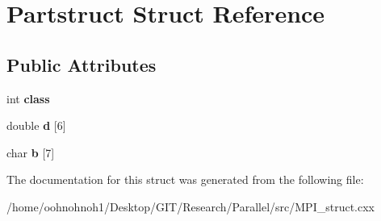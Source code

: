 \hypertarget{structPartstruct}{}\section{Partstruct Struct Reference}
\label{structPartstruct}
\subsection*{Public Attributes}
\begin{DoxyCompactItemize}
\item 
\mbox{\label{structPartstruct_a62ad380a974f632c6d75171ea1f4b7d2}} 
int {\bfseries class}
\item 
\mbox{\label{structPartstruct_ad110813138b77734d28a81bc344033aa}} 
double {\bfseries d} \mbox{[}6\mbox{]}
\item 
\mbox{\label{structPartstruct_ae19dcf24189bec433d17fe6b22669e9e}} 
char {\bfseries b} \mbox{[}7\mbox{]}
\end{DoxyCompactItemize}


The documentation for this struct was generated from the following file\+:\begin{DoxyCompactItemize}
\item 
/home/oohnohnoh1/\+Desktop/\+G\+I\+T/\+Research/\+Parallel/src/M\+P\+I\+\_\+struct.\+cxx\end{DoxyCompactItemize}
